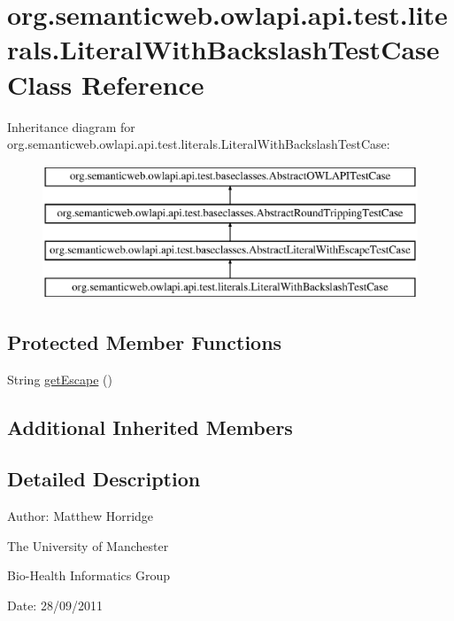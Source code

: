 \hypertarget{classorg_1_1semanticweb_1_1owlapi_1_1api_1_1test_1_1literals_1_1_literal_with_backslash_test_case}{\section{org.\-semanticweb.\-owlapi.\-api.\-test.\-literals.\-Literal\-With\-Backslash\-Test\-Case Class Reference}
\label{classorg_1_1semanticweb_1_1owlapi_1_1api_1_1test_1_1literals_1_1_literal_with_backslash_test_case}
}
Inheritance diagram for org.\-semanticweb.\-owlapi.\-api.\-test.\-literals.\-Literal\-With\-Backslash\-Test\-Case\-:\begin{figure}[H]
\begin{center}
\leavevmode
\includegraphics[height=4.000000cm]{classorg_1_1semanticweb_1_1owlapi_1_1api_1_1test_1_1literals_1_1_literal_with_backslash_test_case}
\end{center}
\end{figure}
\subsection*{Protected Member Functions}
\begin{DoxyCompactItemize}
\item 
String \hyperlink{classorg_1_1semanticweb_1_1owlapi_1_1api_1_1test_1_1literals_1_1_literal_with_backslash_test_case_a9e40fd27257cbca2bcff9e29b4862811}{get\-Escape} ()
\end{DoxyCompactItemize}
\subsection*{Additional Inherited Members}


\subsection{Detailed Description}
Author\-: Matthew Horridge\par
 The University of Manchester\par
 Bio-\/\-Health Informatics Group\par
 Date\-: 28/09/2011 

